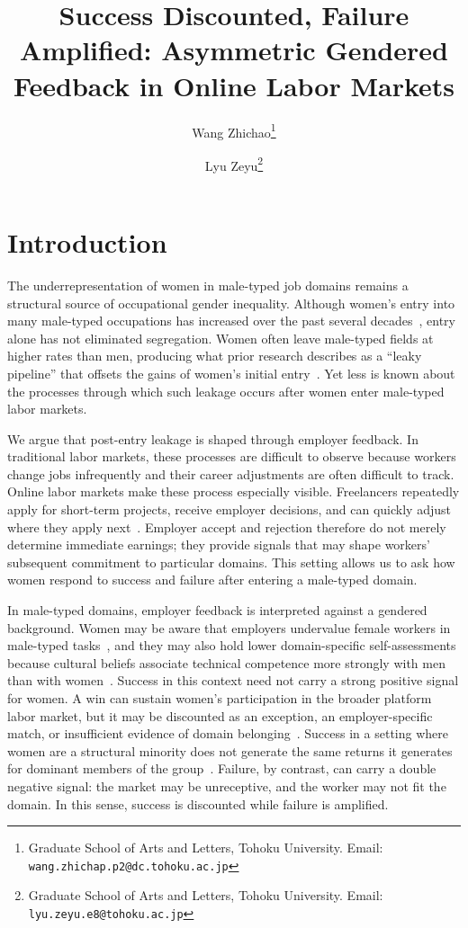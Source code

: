 \documentclass[12pt]{article}
\title{\textbf{Success Discounted, Failure Amplified: Asymmetric Gendered Feedback in Online Labor Markets}}
\author{
  Wang Zhichao\thanks{Graduate School of Arts and Letters, Tohoku University. Email: \texttt{wang.zhichap.p2@dc.tohoku.ac.jp}} \and
  Lyu Zeyu\thanks{Graduate School of Arts and Letters, Tohoku University. Email: \texttt{lyu.zeyu.e8@tohoku.ac.jp}}
}
\date{}
\begin{document}
\maketitle




\section{Introduction}

The underrepresentation of women in male-typed job domains remains a structural source of occupational gender inequality. Although women's entry into many male-typed occupations has increased over the past several decades~\citep{england2010gender, jacobs2004time}, entry alone has not eliminated segregation. Women often leave male-typed fields at higher rates than men, producing what prior research describes as a ``leaky pipeline'' that offsets the gains of women's initial entry~\citep{blickenstaff2005women, hunt2016women, hewlett2008athena}. Yet less is known about the processes through which such leakage occurs after women enter male-typed labor markets.

We argue that post-entry leakage is shaped through employer feedback. In traditional labor markets, these processes are difficult to observe because workers change jobs infrequently and their career adjustments are often difficult to track.
Online labor markets make these process especially visible. Freelancers repeatedly apply for short-term projects, receive employer decisions, and can quickly adjust where they apply next~\citep{leung2017learning, leung2018taking}. Employer accept and rejection therefore do not merely determine immediate earnings; they provide signals that may shape workers' subsequent commitment to particular domains. This setting allows us to ask how women respond to success and failure after entering a male-typed domain.

In male-typed domains, employer feedback is interpreted against a gendered background. Women may be aware that employers undervalue female workers in male-typed tasks~\citep{murcianogoroff2021missing, correll2004constraints, wynn2018puncturing, brands2017leaning, barbulescu2013women}, and they may also hold lower domain-specific self-assessments because cultural beliefs associate technical competence more strongly with men than with women~\citep{correll2001gender, eccles1994understanding, charles2009indulging, ridgeway2011framed}. Success in this context need not carry a strong positive signal for women. A win can sustain women's participation in the broader platform labor market, but it may be discounted as an exception, an employer-specific match, or insufficient evidence of domain belonging~\citep{foschi2000double}. Success in a setting where women are a structural minority does not generate the same returns it generates for dominant members of the group~\citep{kanter1977men}. Failure, by contrast, can carry a double negative signal: the market may be unreceptive, and the worker may not fit the domain. In this sense, success is discounted while failure is amplified.
\end{document}

